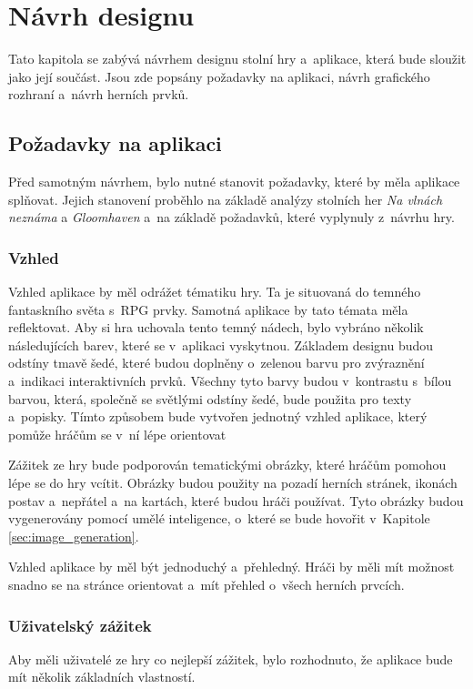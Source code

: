 \chapter{Návrh designu}
Tato kapitola se zabývá návrhem designu stolní hry a~aplikace, která bude sloužit jako její součást. Jsou zde popsány požadavky na aplikaci, návrh grafického rozhraní a~návrh herních prvků.

\section{Požadavky na aplikaci}
Před samotným návrhem, bylo nutné stanovit požadavky, které by měla aplikace splňovat. Jejich stanovení proběhlo na základě analýzy stolních her \textit{Na vlnách neznáma} a \textit{Gloomhaven} a~na základě požadavků, které vyplynuly z~návrhu hry.

\subsection{Vzhled}
Vzhled aplikace by měl odrážet tématiku hry. Ta je situovaná do temného fantaskního světa s~RPG prvky. Samotná aplikace by tato témata měla reflektovat. Aby si hra uchovala tento temný nádech, bylo vybráno několik následujících barev, které se v~aplikaci vyskytnou. Základem designu budou odstíny tmavě šedé, které budou doplněny o~zelenou barvu pro zvýraznění a~indikaci interaktivních prvků. Všechny tyto barvy budou v~kontrastu s~bílou barvou, která, společně se světlými odstíny šedé, bude použita pro texty a~popisky. Tímto způsobem bude vytvořen jednotný vzhled aplikace, který pomůže hráčům se v~ní lépe orientovat

Zážitek ze hry bude podporován tematickými obrázky, které hráčům pomohou lépe se do hry vcítit. Obrázky budou použity na pozadí herních stránek, ikonách postav a~nepřátel a~na kartách, které budou hráči používat. Tyto obrázky budou vygenerovány pomocí umělé inteligence, o~které se bude hovořit v~Kapitole \ref{sec:image_generation}.

Vzhled aplikace by měl být jednoduchý a~přehledný. Hráči by měli mít možnost snadno se na stránce orientovat a~mít přehled o~všech herních prvcích.

\subsection{Uživatelský zážitek}
Aby měli uživatelé ze hry co nejlepší zážitek, bylo rozhodnuto, že aplikace bude mít několik základních vlastností.


